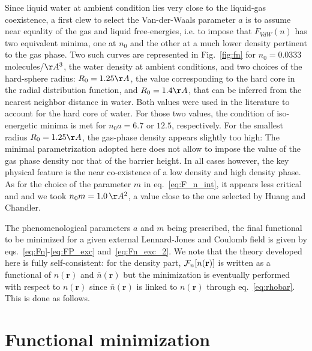 \documentclass[aip,jcp,preprint]{revtex4-1}
\newcommand{\rr}{\mathbf{r}}
\newcommand{\rhon}{{n\left({\mathbf r}\right)}}
\newcommand{\F}{{\cal F}}
\newcommand{\rhonbar}{\bar{n}({\mathbf r})}
\begin{document}
Since liquid water at ambient condition lies very close to the liquid-gas coexistence, a first clew to select the Van-der-Waals parameter $a$ is to assume near equality of the gas and liquid free-energies, i.e. to impose that $F_{VdW}(n)$ has two equivalent minima, one at $n_0$ and the other at a much lower density pertinent to the gas phase. Two such curves are represented in Fig.~\ref{fig:fn} for $n_0=0.0333$ molecules/$\AA^3$, the water density at ambient conditions, and two choices of the hard-sphere radius: $R_0=1.25 \AA$, the value corresponding to the hard core in the radial distribution function, and $R_0 = 1.4 \AA$, that can be inferred from  the nearest neighbor distance in water. Both values were used in the literature\cite{oleksy10,zhao-wu11,levesque12_1} to account for the hard core of water. For those two values, the condition of  iso-energetic minima is met for  $n_0a = 6.7$ or $12.5$, respectively. For the smallest radius $R_0 = 1.25 \AA$, the gas-phase density appears slightly too high:  The minimal parametrization adopted here does not allow to impose the value of the gas phase density nor that of the barrier height. In all cases however, the key physical feature is the near co-existence of a low density and high density phase. As for the choice of the parameter  $m$ in eq.~\ref{eq:F_n_int}, it  appears less critical and and we took $n_0m=1.0 \, \AA^2$, a value close to the one selected by Huang and Chandler\cite{huang02}. %

The phenomenological parameters $a$ and $m$ being prescribed, the final functional to be minimized for a given external Lennard-Jones and Coulomb field is given by eqs.~\ref{eq:Fn}-\ref{eq:FP_exc} and~\ref{eq:Fn_exc_2}. We note that the theory developed here is fully self-consistent: for the density part, $\F_n[n(\rr)]$ is written  as a functional of $\rhon$ and $\rhonbar$ but the minimization is eventually performed with respect to  $\rhon$ since $\rhonbar$ is  linked to $\rhon$ through eq.~{\ref{eq:rhobar}}. This is done as follows.




\section{Functional minimization}
\end{document}
